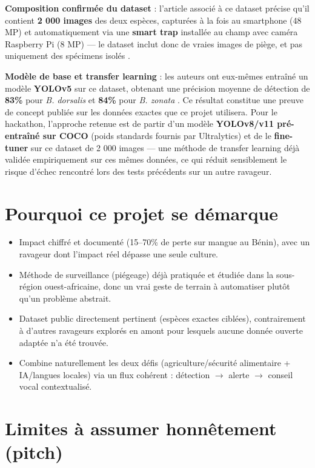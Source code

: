 \documentclass[11pt,a4paper]{article}
\begin{document}
\textbf{Composition confirmée du dataset} : l'article associé à ce dataset précise qu'il contient \textbf{2 000 images} des deux espèces, capturées à la fois au smartphone (48 MP) et automatiquement via une \textbf{smart trap} installée au champ avec caméra Raspberry Pi (8 MP) --- le dataset inclut donc de vraies images de piège, et pas uniquement des spécimens isolés \cite{pmc_fruitfly}.

\textbf{Modèle de base et transfer learning} : les auteurs ont eux-mêmes entraîné un modèle \textbf{YOLOv5} sur ce dataset, obtenant une précision moyenne de détection de \textbf{83\%} pour \textit{B. dorsalis} et \textbf{84\%} pour \textit{B. zonata} \cite{pmc_fruitfly}. Ce résultat constitue une preuve de concept publiée sur les données exactes que ce projet utilisera. Pour le hackathon, l'approche retenue est de partir d'un modèle \textbf{YOLOv8/v11 pré-entraîné sur COCO} (poids standards fournis par Ultralytics) et de le \textbf{fine-tuner} sur ce dataset de 2 000 images --- une méthode de transfer learning déjà validée empiriquement sur ces mêmes données, ce qui réduit sensiblement le risque d'échec rencontré lors des tests précédents sur un autre ravageur.

\section{Pourquoi ce projet se démarque}

\begin{itemize}
    \item Impact chiffré et documenté (15--70\% de perte sur mangue au Bénin), avec un ravageur dont l'impact réel dépasse une seule culture.
    \item Méthode de surveillance (piégeage) déjà pratiquée et étudiée dans la sous-région ouest-africaine, donc un vrai geste de terrain à automatiser plutôt qu'un problème abstrait.
    \item Dataset public directement pertinent (espèces exactes ciblées), contrairement à d'autres ravageurs explorés en amont pour lesquels aucune donnée ouverte adaptée n'a été trouvée.
    \item Combine naturellement les deux défis (agriculture/sécurité alimentaire + IA/langues locales) via un flux cohérent : détection $\rightarrow$ alerte $\rightarrow$ conseil vocal contextualisé.
\end{itemize}

\section{Limites à assumer honnêtement (pitch)}
\end{document}
